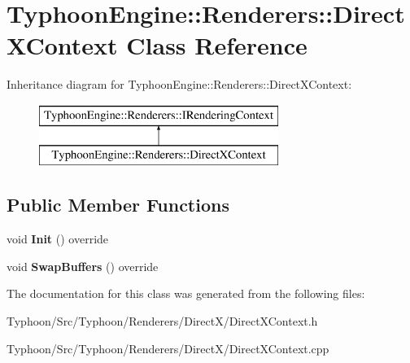 \hypertarget{class_typhoon_engine_1_1_renderers_1_1_direct_x_context}{}\section{Typhoon\+Engine\+::Renderers\+::Direct\+X\+Context Class Reference}
\label{class_typhoon_engine_1_1_renderers_1_1_direct_x_context}
Inheritance diagram for Typhoon\+Engine\+::Renderers\+::Direct\+X\+Context\+:\begin{figure}[H]
\begin{center}
\leavevmode
\includegraphics[height=2.000000cm]{class_typhoon_engine_1_1_renderers_1_1_direct_x_context}
\end{center}
\end{figure}
\subsection*{Public Member Functions}
\begin{DoxyCompactItemize}
\item 
\mbox{\label{class_typhoon_engine_1_1_renderers_1_1_direct_x_context_a8b32a57e89d8036aa5a19b29be332a92}} 
void {\bfseries Init} () override
\item 
\mbox{\label{class_typhoon_engine_1_1_renderers_1_1_direct_x_context_aa3e95fc4d155b5210d4ed692baf9d8a8}} 
void {\bfseries Swap\+Buffers} () override
\end{DoxyCompactItemize}


The documentation for this class was generated from the following files\+:\begin{DoxyCompactItemize}
\item 
Typhoon/\+Src/\+Typhoon/\+Renderers/\+Direct\+X/Direct\+X\+Context.\+h\item 
Typhoon/\+Src/\+Typhoon/\+Renderers/\+Direct\+X/Direct\+X\+Context.\+cpp\end{DoxyCompactItemize}

